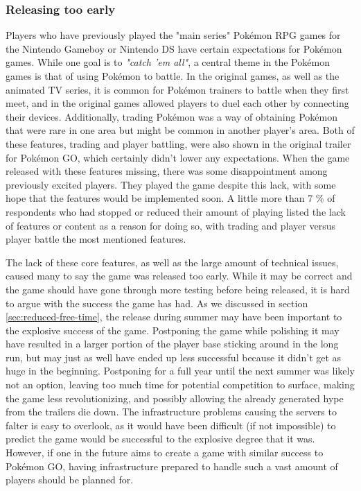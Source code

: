 
\subsubsection{Releasing too early}
Players who have previously played the "main series" Pokémon RPG games for the Nintendo Gameboy or Nintendo DS have certain expectations for Pokémon games. While one goal is to \emph{"catch 'em all"}, a central theme in the Pokémon games is that of using Pokémon to battle. In the original games, as well as the animated TV series, it is common for Pokémon trainers to battle when they first meet, and in the original games allowed players to duel each other by connecting their devices. Additionally, trading Pokémon was a way of obtaining Pokémon that were rare in one area but might be common in another player's area. Both of these features, trading and player battling, were also shown in the original trailer for Pokémon GO, which certainly didn't lower any expectations. When the game released with these features missing, there was some disappointment among previously excited players. They played the game despite this lack, with some hope that the features would be implemented soon. A little more than 7 \% of respondents who had stopped or reduced their amount of playing listed the lack of features or content as a reason for doing so, with trading and player versus player battle the most mentioned features.

The lack of these core features, as well as the large amount of technical issues, caused many to say the game was released too early. While it may be correct and the game should have gone through more testing before being released, it is hard to argue with the success the game has had. As we discussed in section \ref{sec:reduced-free-time}, the release during summer may have been important to the explosive success of the game. Postponing the game while polishing it may have resulted in a larger portion of the player base sticking around in the long run, but may just as well have ended up less successful because it didn't get as huge in the beginning.  Postponing for a full year until the next summer was likely not an option, leaving too much time for potential competition to surface, making the game less revolutionizing, and possibly allowing the already generated hype from the trailers die down. The infrastructure problems causing the servers to falter is easy to overlook, as it would have been difficult (if not impossible) to predict the game would be successful to the explosive degree that it was. However, if one in the future aims to create a game with similar success to Pokémon GO, having infrastructure prepared to handle such a vast amount of players should be planned for.

